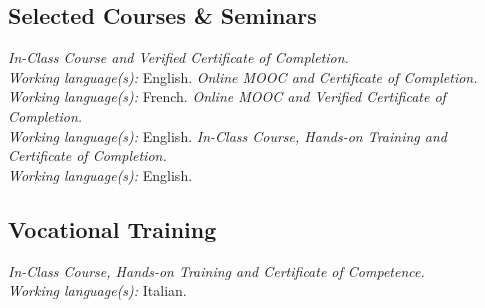 \documentclass[
  a4paper, 
]{fortysecondscv}
\begin{document}
\subsection{Selected Courses \& Seminars}
\begin{cvtable}
		{{\small\emph{\small In-Class Course and Verified Certificate of Completion.}\\\textit{\small Working language(s):} English.}}
		{{\small\emph{\small Online MOOC and Certificate of Completion.}\\\textit{\small Working language(s):} French.}}
		{{\small\emph{\small Online MOOC and Verified Certificate of Completion.}\\\textit{\small Working language(s):} English.}}
		{{\small\emph{\small In-Class Course, Hands-on Training and Certificate of Completion.}\\\textit{\small Working language(s):} English.}}
\end{cvtable}
\subsection{Vocational Training}
\begin{cvtable}
		{{\small\emph{\small In-Class Course, Hands-on Training and Certificate of Competence.}\\\textit{\small Working language(s):} Italian.}}
\end{cvtable}
\end{document}
